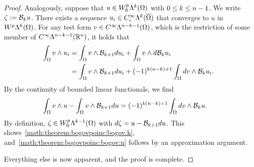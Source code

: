 \documentclass[10pt,a4paper]{article}
\begin{document}
\begin{proof}
    Analogously, suppose that $u \in W^{p}_{0}\Lambda^{k}(\Omega)$ with $0 \leq k \leq n-1$. 
    We write $\zeta := {\mathcal B}_{k} u$. 
    There exists a sequence $u_{i} \in C^{\infty}_{c}\Lambda^{k}(\overline\Omega)$ that converges to $u$ in $W^{p}\Lambda^{k}(\Omega)$. 
    For any test form $v \in C^{\infty}\Lambda^{n-k-1}(\Omega)$, 
    which is the restriction of some member of $C^{\infty}\Lambda^{n-k-1}({\mathbb R}^{n})$, 
    it holds that 
    \begin{align*}
        \int_{\Omega} v \wedge u_{i} 
        &=
        \int_{\Omega} v \wedge {\mathcal B}_{k+1} d u_{i}
        +
        \int_{\Omega} v \wedge d {\mathcal B}_{k  } u_{i}
        \\&=
        \int_{\Omega} v \wedge {\mathcal B}_{k+1} d u_{i}
        +
        (-1)^{k(n-k)+1}
        \int_{\Omega} d v \wedge {\mathcal B}_{k  } u_{i}
        .
    \end{align*}
    By the continuity of bounded linear functionals, we find 
    \begin{align*}
        \int_{\Omega} v \wedge u 
        -
        \int_{\Omega} v \wedge {\mathcal B}_{k+1} d u
        &=
        (-1)^{k(n-k)+1}
        \int_{\Omega} d v \wedge {\mathcal B}_{k  } u 
        .
    \end{align*}
    By definition, $\zeta \in W^{p}_{0}\Lambda^{k-1}(\Omega)$ with $d \zeta = u - {\mathcal B}_{k+1} d u$.
    This shows~\eqref{math:theorem:bogovpoinc:bogov:k}, and~\eqref{math:theorem:bogovpoinc:bogov:n} follows by an approximation argument.
    
    Everything else is now apparent, and the proof is complete. 
\begin{comment}
    It suffices to discuss the case $1 \leq p < \infty$, because the domain is bounded 
    and taking the limit will then imply the inequality with $p = \infty$. 
    The potential operators are linear and satisfy the stated bounds over $C^{\infty}_{c}\Alt^{\mia}(\Omega)$,
    which is a dense subspace of $L^{p}\Alt^{\mia}(\Omega)$. 

    \color{blue}
    Let $u \in W^{p}_{ }\Alt^{\mia}(\Omega)$ with $0 \leq \mia \leq n-1$ and set $w = \Poinc_{\mia} \cartan u$.
    There exists a sequence $u_{i} \in C^{\infty}\Alt^{\mia}(\overline\Omega)$ that converges to $u$ in $W^{p}\Alt^{\mia}(\Omega)$. 
    For any test form $v \in C^{\infty}_{c}\Alt^{n-\mia-1}(\Omega)$, we verify 
    \begin{align*}
        \int_{\Omega} \cartan v \wedge \Poinc_{\mia+1} \cartan u_{i}
        =
        \int_{\Omega} v \wedge \cartan \Poinc_{\mia+1} \cartan u_{i}
        =
        \int_{\Omega} v \wedge \cartan u_{i}
        .
    \end{align*}
    By the continuity of bounded linear functionals, we find 
    \begin{align*}
        \int_{\Omega} v \wedge \cartan u 
        &=
        (-1)^{\mia(n-\mia)+1}
        \int_{\Omega} \cartan v \wedge w
        .
    \end{align*}
    By definition, $w \in W^{p}\Alt^{\mia-1}(\Omega)$ with $\cartan w = u$.
    \color{black}
    

\end{comment}
\end{proof}
\end{document}
